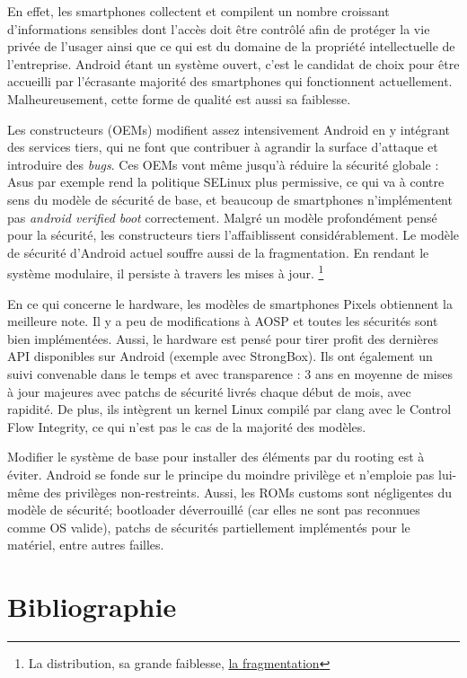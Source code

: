 \documentclass[
  french,
  paper=a4,
  ,captions=tableheading
]{scrartcl}
\begin{document}
En effet, les smartphones collectent et compilent un nombre croissant d'informations sensibles dont l'accès doit être contrôlé afin de protéger la vie privée de l'usager ainsi que ce qui est du domaine de la propriété intellectuelle de l'entreprise. Android étant un système ouvert, c'est le candidat de choix pour être accueilli par l'écrasante majorité des smartphones qui fonctionnent actuellement. Malheureusement, cette forme de qualité est aussi sa faiblesse.

Les constructeurs (OEMs) modifient assez intensivement Android en y intégrant des services tiers, qui ne font que contribuer à agrandir la surface d'attaque et introduire des \emph{bugs}. Ces OEMs vont même jusqu'à réduire la sécurité globale : Asus par exemple rend la politique SELinux plus permissive, ce qui va à contre sens du modèle de sécurité de base, et beaucoup de smartphones n'implémentent pas \emph{android verified boot} correctement.  Malgré un modèle profondément pensé pour la sécurité, les constructeurs tiers l'affaiblissent considérablement. Le modèle de sécurité d'Android actuel souffre aussi de la fragmentation. En rendant le système modulaire, il persiste à travers les mises à jour. \footnote{La distribution, sa grande faiblesse,
  \href{https://wonderfall.space/modele-securite-mobile/}{la fragmentation}}

En ce qui concerne le hardware, les modèles de smartphones Pixels obtiennent la meilleure note. Il y a peu de modifications à AOSP et toutes les sécurités sont bien implémentées. Aussi, le hardware est pensé pour tirer profit des dernières API disponibles sur Android (exemple avec StrongBox). Ils ont également un suivi convenable dans le temps et avec transparence : 3 ans en moyenne de mises à jour majeures avec patchs de sécurité livrés chaque début de mois, avec rapidité. De plus, ils intègrent un kernel Linux compilé par clang avec le Control Flow Integrity, ce qui n'est pas le cas de la majorité des modèles.

Modifier le système de base pour installer des éléments par du rooting est à éviter. Android se fonde sur le principe du moindre privilège et n'emploie pas lui-même des privilèges non-restreints. Aussi, les ROMs customs sont négligentes du modèle de sécurité; bootloader déverrouillé (car elles ne sont pas reconnues comme OS valide), patchs de sécurités partiellement implémentés pour le matériel, entre autres failles.

\newpage

\hypertarget{bibliographie}{%
\section{Bibliographie}\label{bibliographie}}
\end{document}
